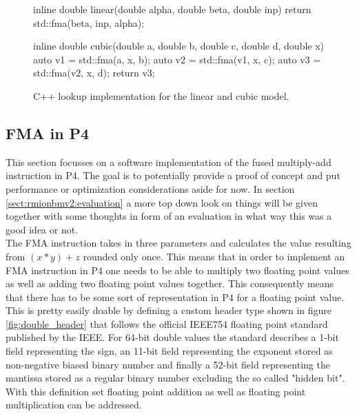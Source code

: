 \captionsetup[figure]{skip=-10pt} %
\begin{figure}[ht]
  \begin{C++}
inline double linear(double alpha, double beta, double inp) {
  return std::fma(beta, inp, alpha);
}

inline double cubic(double a, double b, double c, double d, double x) {
  auto v1 = std::fma(a, x, b);
  auto v2 = std::fma(v1, x, c);
  auto v3 = std::fma(v2, x, d);
  return v3;
}\end{C++}
  \caption[Linear and Cubic lookup implementation in C++]{ C++ lookup implementation for the linear and cubic model. }
  \label{fig:linear_cubic}
\end{figure}

\subsection{FMA in P4}
\label{sect:rmionbmv2:fma}
This section focusses on a software implementation of the fused multiply-add instruction in P4. The goal is to potentially provide a proof of concept and put performance or optimization considerations aside for now. In section \ref{sect:rmionbmv2:evaluation} a more top down look on things will be given together with some thoughts in form of an evaluation in what way this was a good idea or not.\\

The FMA instruction takes in three parameters and calculates the value resulting from \((x * y) + z\) rounded only once. This means that in order to implement an FMA instruction in P4 one needs to be able to multiply two floating point values as well as adding two floating point values together. This consequently means that there has to be some sort of representation in P4 for a floating point value. This is pretty easily doable by defining a custom header type shown in figure \ref{fig:double_header} that follows the official IEEE754 floating point standard \cite{ieee754} published by the IEEE. For 64-bit double values the standard describes a 1-bit field representing the sign, an 11-bit field representing the exponent stored as non-negative biased binary number and finally a 52-bit field representing the mantissa stored as a regular binary number excluding the so called "hidden bit". With this definition set floating point addition as well as floating point multiplication can be addressed.\\

